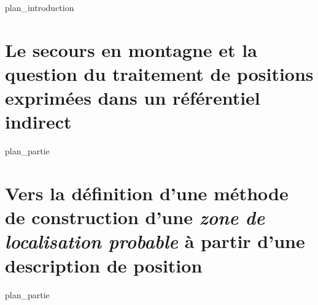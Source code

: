 \label{part:int}
{plan_introduction}
\part{Le secours en montagne et la question du traitement de positions exprimées dans un référentiel indirect}
\label{part:01}
{plan_partie}
\part{Vers la définition d'une méthode de construction d'une
  \emph{zone de localisation probable} à partir d'une description de
  position}
\label{part:02}
{plan_partie}

